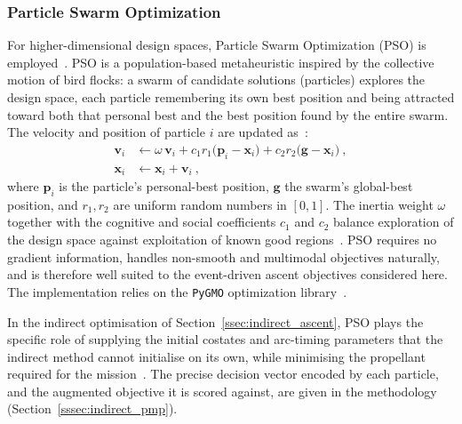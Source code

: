 
\subsubsection{Particle Swarm Optimization}

For higher-dimensional design spaces, Particle Swarm Optimization (PSO) is employed~\cite{kennedy1995particle}. PSO is a population-based metaheuristic inspired by the collective motion of bird flocks: a swarm of candidate solutions (particles) explores the design space, each particle remembering its own best position and being attracted toward both that personal best and the best position found by the entire swarm. The velocity and position of particle $i$ are updated as~\cite{kennedy1995particle, shi1998modified}:
\begin{equation}
\begin{aligned}
\mathbf{v}_i &\leftarrow \omega\,\mathbf{v}_i + c_1 r_1\bigl(\mathbf{p}_i-\mathbf{x}_i\bigr) + c_2 r_2\bigl(\mathbf{g}-\mathbf{x}_i\bigr) \ ,\\
\mathbf{x}_i &\leftarrow \mathbf{x}_i + \mathbf{v}_i \ ,
\end{aligned}
\label{eq:pso_update}
\end{equation}
where $\mathbf{p}_i$ is the particle's personal-best position, $\mathbf{g}$ the swarm's global-best position, and $r_1,r_2$ are uniform random numbers in $[0,1]$. The inertia weight $\omega$ together with the cognitive and social coefficients $c_1$ and $c_2$ balance exploration of the design space against exploitation of known good regions~\cite{shi1998modified}. PSO requires no gradient information, handles non-smooth and multimodal objectives naturally, and is therefore well suited to the event-driven ascent objectives considered here. The implementation relies on the \texttt{PyGMO} optimization library~\cite{biscani2020pagmo}.

In the indirect optimisation of Section~\ref{ssec:indirect_ascent}, PSO plays the specific role of supplying the initial costates and arc-timing parameters that the indirect method cannot initialise on its own, while minimising the propellant required for the mission~\cite{pontani2014particle}. The precise decision vector encoded by each particle, and the augmented objective it is scored against, are given in the methodology (Section~\ref{sssec:indirect_pmp}).


